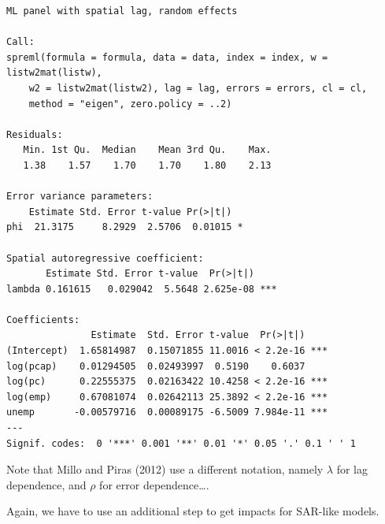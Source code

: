 \documentclass[
  letterpaper,
  DIV=11,
  numbers=noendperiod]{scrreprt}
\newenvironment{Shaded}{\begin{snugshade}}{\end{snugshade}}
\newcommand{\AttributeTok}[1]{\textcolor[rgb]{0.40,0.45,0.13}{#1}}
\newcommand{\CommentTok}[1]{\textcolor[rgb]{0.37,0.37,0.37}{#1}}
\newcommand{\FunctionTok}[1]{\textcolor[rgb]{0.28,0.35,0.67}{#1}}
\newcommand{\NormalTok}[1]{\textcolor[rgb]{0.00,0.23,0.31}{#1}}
\newcommand{\OtherTok}[1]{\textcolor[rgb]{0.00,0.23,0.31}{#1}}
\newcommand{\SpecialCharTok}[1]{\textcolor[rgb]{0.37,0.37,0.37}{#1}}
\begin{document}
\begin{verbatim}
ML panel with spatial lag, random effects 

Call:
spreml(formula = formula, data = data, index = index, w = listw2mat(listw), 
    w2 = listw2mat(listw2), lag = lag, errors = errors, cl = cl, 
    method = "eigen", zero.policy = ..2)

Residuals:
   Min. 1st Qu.  Median    Mean 3rd Qu.    Max. 
   1.38    1.57    1.70    1.70    1.80    2.13 

Error variance parameters:
    Estimate Std. Error t-value Pr(>|t|)  
phi  21.3175     8.2929  2.5706  0.01015 *

Spatial autoregressive coefficient:
       Estimate Std. Error t-value  Pr(>|t|)    
lambda 0.161615   0.029042  5.5648 2.625e-08 ***

Coefficients:
               Estimate  Std. Error t-value  Pr(>|t|)    
(Intercept)  1.65814987  0.15071855 11.0016 < 2.2e-16 ***
log(pcap)    0.01294505  0.02493997  0.5190    0.6037    
log(pc)      0.22555375  0.02163422 10.4258 < 2.2e-16 ***
log(emp)     0.67081074  0.02642113 25.3892 < 2.2e-16 ***
unemp       -0.00579716  0.00089175 -6.5009 7.984e-11 ***
---
Signif. codes:  0 '***' 0.001 '**' 0.01 '*' 0.05 '.' 0.1 ' ' 1
\end{verbatim}

Note that Millo and Piras (2012) use a different notation, namely
\(\lambda\) for lag dependence, and \(\rho\) for error dependence\ldots.

Again, we have to use an additional step to get impacts for SAR-like
models.

\begin{Shaded}
\end{Shaded}
\end{document}
